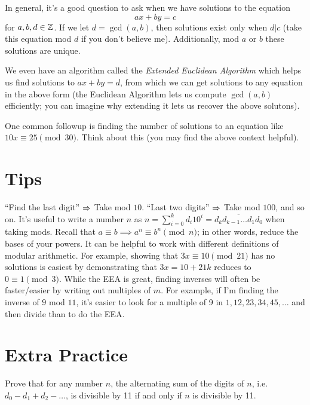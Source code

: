 \documentclass[11 pt]{scrartcl}
\begin{document}
In general, it's a good question to ask when we have solutions to the equation 
\[ ax + by = c\] 
for $a,b,d \in \mathbb Z$. If we let $d = \gcd(a,b)$, then solutions exist only when $d | c$ (take this equation mod $d$ if you don't believe me). Additionally, mod $a$ or $b$ these solutions are unique. 

We even have an algorithm called the \emph{Extended Euclidean Algorithm} which helps us find solutions to $ax+by = d$, from which we can get solutions to any equation in the above form (the Euclidean Algorithm lets us compute $\gcd(a,b)$ efficiently; you can imagine why extending it lets us recover the above solutons). 

One common followup is finding the number of solutions to an equation like $10x \equiv 25 \pmod{30}$. Think about this (you may find the above context helpful).

\section{Tips}
\itemnum
    \ii ``Find the last digit'' $\Rightarrow$ Take mod $10$. ``Last two digits'' $\Rightarrow$ Take mod $100$, and so on. 
    \ii It's useful to write a number $n$ as $n = \sum_{i=0}^k d_i 10^i = \overline{d_kd_{k-1}\dots d_1d_0}$ when taking mods. 
    \ii Recall that $a\equiv b \implies a^n \equiv b^n \pmod{n}$; in other words, reduce the bases of your powers. 
    \ii It can be helpful to work with different definitions of modular arithmetic. For example, showing that $3x\equiv 10 \pmod{21}$ has no solutions is easiest by demonstrating that $3x = 10 + 21k$ reduces to $0\equiv 1 \pmod{3}$.
    \ii While the EEA is great, finding inverses will often be faster/easier by writing out multiples of $m$. For example, if I'm finding the inverse of $9$ mod $11$, it's easier to look for a multiple of 9 in $1, 12, 23, 34, 45, \dots$ and then divide than to do the EEA. 
\itemend

\section{Extra Practice}
\begin{exercise}
    Prove that for any number $n$, the alternating sum of the digits of $n$, i.e. $d_0 - d_1 + d_2 - \dots$, is divisible by 11 if and only if $n$ is divisible by 11. 
\end{exercise}
\end{document}
